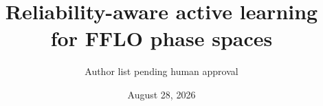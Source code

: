 \documentclass[aps,prl,reprint,superscriptaddress,floatfix]{revtex4-2}
\begin{document}
\title{Reliability-aware active learning for FFLO phase spaces}
\author{Author list pending human approval}
\date{August 28, 2026}
\begin{abstract}

\end{abstract}
\maketitle





\end{document}
